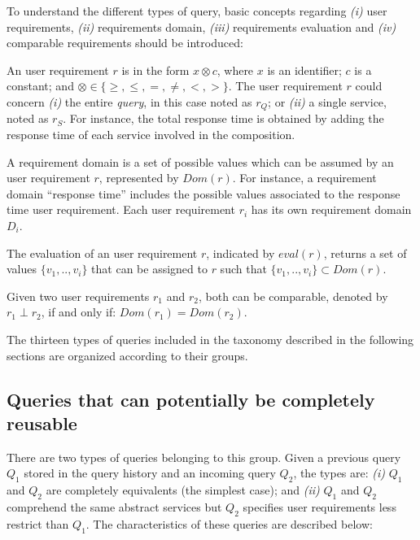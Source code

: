 To understand the different types of query, basic concepts regarding \textit{(i)} user requirements, \textit{(ii)} requirements domain, \textit{(iii)} requirements evaluation and \textit{(iv)} comparable requirements should be introduced:

\begin{definition}
An user requirement $r$ is in the form $x \otimes c$, where $x$ is an identifier; $c$ is a constant; and $\otimes \in\lbrace \geq, \leq, =, \neq, <, >\rbrace$. 
%
The user requirement $r$ could concern \textit{(i)} the entire \textsl{query}, in this case noted as $r_{Q}$; or \textit{(ii)} a single service, noted as $r_{S}$. For instance, the total response time is obtained by adding the response time of each service involved in the composition.
\end{definition}

\begin{definition}
A requirement domain is a set of possible values which can be assumed by an user requirement $r$, represented by $Dom(r)$. 
For instance, a requirement domain ``response time'' includes the possible values associated to the response time user requirement. 
Each user requirement $r_{i}$ has its own requirement domain $D_{i}$. 
\end{definition}

\begin{definition}
The evaluation of an user requirement $r$, indicated by $eval(r)$, returns a set of values $\lbrace v_{1},..,v_{i} \rbrace$ that can be assigned to $r$ such that $\lbrace v_{1},..,v_{i} \rbrace \subset Dom(r)$.
\end{definition}

\begin{definition}
Given two user requirements $r_{1}$ and $r_{2}$, both can be comparable, denoted by $r_{1} \perp r_{2}$, if and only if:  $Dom(r_{1}) = Dom(r_{2})$.
\end{definition}

The thirteen types of queries included in the taxonomy described in the following sections are organized according to their groups.

\subsection{Queries that can potentially be completely reusable}

There are two types of queries belonging to this group. Given a previous query $Q_{1}$ stored in the query history and an incoming query $Q_{2}$, the types are: \textit{(i)} $Q_{1}$ and $Q_{2}$ are completely equivalents (the simplest case); and \textit{(ii)} $Q_{1}$ and $Q_{2}$ comprehend the same abstract services but $Q_{2}$ specifies user requirements less restrict than $Q_{1}$. The characteristics of these queries are described below:

